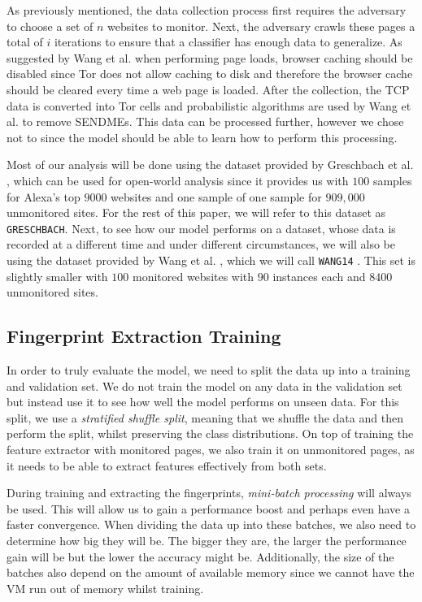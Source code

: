 As previously mentioned, the data collection process first requires the adversary to choose a set of $n$ websites to monitor.
Next, the adversary crawls these pages a total of $i$ iterations to ensure that a classifier has enough data to generalize.
As suggested by Wang et al. when performing page loads, browser caching should be disabled since Tor does not allow caching to disk and therefore the browser cache should be cleared every time a web page is loaded\cite{wang_goldberg_2013}.
After the collection, the TCP data is converted into Tor cells and probabilistic algorithms are used by Wang et al. \cite{wang_goldberg_2013} to remove SENDMEs.
This data can be processed further, however we chose not to since the model should be able to learn how to perform this processing.

Most of our analysis will be done using the dataset provided by Greschbach et al. \cite{greschbach2016effect}, which can be used for open-world analysis since it provides us with $100$ samples for Alexa's top $9000$ websites and one sample of one sample for $909,000$ unmonitored sites.
For the rest of this paper, we will refer to this dataset as \texttt{GRESCHBACH}.
Next, to see how our model performs on a dataset, whose data is recorded at a different time and under different circumstances, we will also be using the dataset provided by Wang et al. \cite{wang_cai_johnson_nithyanand_goldberg_2014}, which we will call \texttt{WANG14} \cite{panchenko2}.
This set is slightly smaller with $100$ monitored websites with $90$ instances each and $8400$ unmonitored sites.

\subsection{Fingerprint Extraction Training} \label{sec:fingerprint-extraction-training}

In order to truly evaluate the model, we need to split the data up into a training and validation set.
We do not train the model on any data in the validation set but instead use it to see how well the model performs on unseen data.
For this split, we use a \textit{stratified shuffle split}, meaning that we shuffle the data and then perform the split, whilst preserving the class distributions.
On top of training the feature extractor with monitored pages, we also train it on unmonitored pages, as it needs to be able to extract features effectively from both sets.

During training and extracting the fingerprints, \textit{mini-batch processing} will always be used.
This will allow us to gain a performance boost and perhaps even have a faster convergence.
When dividing the data up into these batches, we also need to determine how big they will be.
The bigger they are, the larger the performance gain will be but the lower the accuracy might be.
Additionally, the size of the batches also depend on the amount of available memory since we cannot have the VM run out of memory whilst training.

